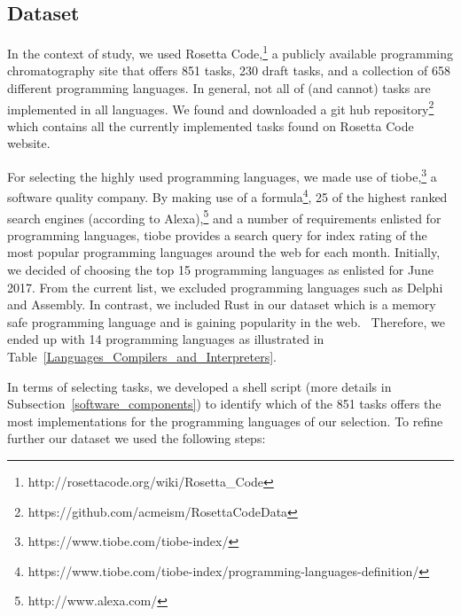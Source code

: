 \subsection{Dataset}
In the context of study, we used Rosetta 
Code,\footnote{http://rosettacode.org/wiki/Rosetta\_Code} a 
publicly available programming chromatography site that offers 
851 tasks, 230 draft tasks, and a collection of 658 different 
programming languages. In general, not all of (and cannot) tasks 
are implemented in all languages. 
We found and downloaded a git hub repository\footnote{https://github.com/acmeism/RosettaCodeData} 
which contains all the currently implemented tasks found on 
Rosetta Code website.

For selecting the highly used programming languages, we made use 
of tiobe,\footnote{https://www.tiobe.com/tiobe-index/} a software 
quality company.
By making use of a formula\footnote{https://www.tiobe.com/tiobe-index/programming-languages-definition/}, 
25 of the highest ranked search engines (according to Alexa),\footnote{http://www.alexa.com/} 
and a number of requirements enlisted for programming languages, 
tiobe provides a search query for index rating of the most popular 
programming languages around the web for each month. 
Initially, we decided of choosing the top 15 programming languages 
as enlisted for June 2017. 
From the current list, we excluded programming languages such as 
Delphi and Assembly. 
In contrast, we included Rust in our dataset which is a memory safe 
programming language and is gaining popularity in the web. \
Therefore, we ended up with 14 programming languages as illustrated 
in Table~\ref{Languages_Compilers_and_Interpreters}.

In terms of selecting tasks, we developed a shell script (more 
details in Subsection~\ref{software_components}) to identify 
which of the 851 tasks offers the most implementations for the 
programming languages of our selection. 
To refine further our dataset we used the following steps: 

